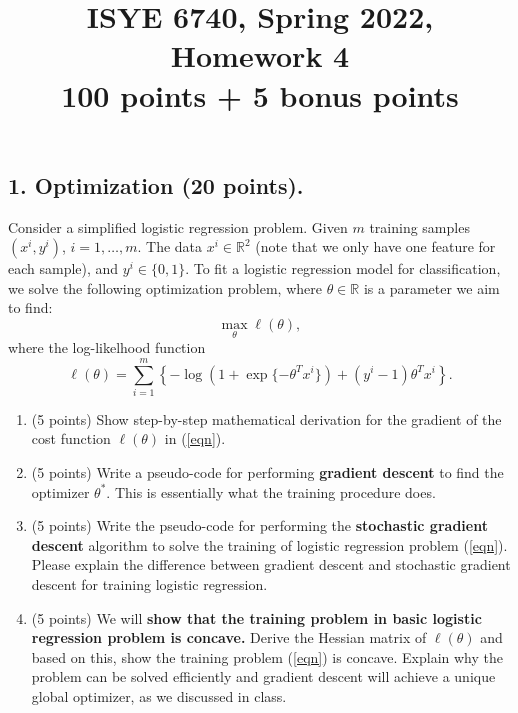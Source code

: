 \documentclass[twoside,10pt]{article}
\begin{document}
\title{ISYE 6740, Spring 2022, Homework 4\\ 
  100 points + 5 bonus points }
\date{}
\maketitle



\subsection*{\bf 1. Optimization (20 points).}

Consider a simplified logistic regression problem. 
Given $m$ training samples $(x^i, y^i)$, $i = 1, \ldots, m$. The data $x^i \in \mathbb R^2$ (note that we only have one feature for each sample), and $y^i \in \{0, 1\}$.  To fit a logistic regression model for classification, we solve the following optimization problem, where $\theta \in \mathbb R$ is a parameter we aim to find:
\begin{equation}
\max_\theta \ell (\theta), \label{eqn}
\end{equation}
where the log-likelhood function \[\ell(\theta) = \sum_{i=1}^m \left\{-\log (1+\exp\{-\theta^T x^i\}) + (y^i-1) \theta^T x^i\right\}.\]

\begin{enumerate}
\item (5 points) Show step-by-step mathematical derivation for the gradient of the cost function $\ell(\theta)$ in (\ref{eqn}).
\item (5 points) Write a pseudo-code  for performing {\bf gradient descent} to find the optimizer $\theta^*$. This is essentially what the training procedure does. 
\item (5 points) Write the pseudo-code for performing the {\bf stochastic gradient descent} algorithm to solve the training of logistic regression problem (\ref{eqn}). Please explain the difference between gradient descent and stochastic gradient descent for training logistic regression.
\item (5 points) We will {\bf show that the training problem in basic logistic regression problem is concave.} Derive the Hessian matrix of $\ell(\theta)$ and based on this, show the training problem (\ref{eqn}) is concave. Explain why the problem can be solved efficiently and gradient descent will achieve a unique global optimizer, as we discussed in class. 
\end{enumerate}
\end{document}
